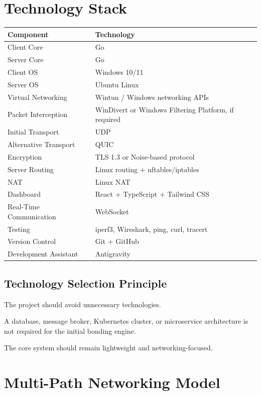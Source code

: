 \documentclass[12pt,a4paper]{article}
\begin{document}
\section{Technology Stack}

\begin{longtable}{p{} p{}}
\toprule
\textbf{Component} & \textbf{Technology} \\
\midrule
Client Core & Go \\
Server Core & Go \\
Client OS & Windows 10/11 \\
Server OS & Ubuntu Linux \\
Virtual Networking & Wintun / Windows networking APIs \\
Packet Interception & WinDivert or Windows Filtering Platform, if required \\
Initial Transport & UDP \\
Alternative Transport & QUIC \\
Encryption & TLS 1.3 or Noise-based protocol \\
Server Routing & Linux routing + nftables/iptables \\
NAT & Linux NAT \\
Dashboard & React + TypeScript + Tailwind CSS \\
Real-Time Communication & WebSocket \\
Testing & iperf3, Wireshark, ping, curl, tracert \\
Version Control & Git + GitHub \\
Development Assistant & Antigravity \\
\bottomrule
\end{longtable}

\subsection{Technology Selection Principle}

The project should avoid unnecessary technologies.

A database, message broker, Kubernetes cluster, or microservice architecture is not required for the initial bonding engine.

The core system should remain lightweight and networking-focused.


\section{Multi-Path Networking Model}
\end{document}
